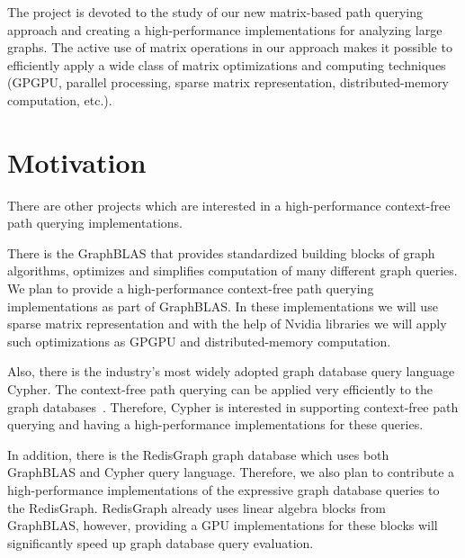 \documentclass[12pt]{article}  %
\theoremstyle{remark}
\begin{document}
The project is devoted to the study of our new matrix-based path querying approach and creating a high-performance implementations for analyzing large graphs. The active use of matrix operations in our approach makes it possible to efficiently apply a wide class of matrix optimizations and computing techniques (GPGPU, parallel processing, sparse matrix representation, distributed-memory computation, etc.).

\section{Motivation}
There are other projects which are interested in a high-performance context-free path querying implementations.

There is the GraphBLAS that provides standardized building blocks of graph algorithms, optimizes and simplifies computation of many different graph queries. We plan to provide a high-performance context-free path querying implementations as part of GraphBLAS. In these implementations we will use sparse matrix representation and with the help of Nvidia libraries we will apply such optimizations as GPGPU and distributed-memory computation.

Also, there is the industry’s most widely adopted graph database query language Cypher. The context-free path querying can be applied very efficiently to the graph databases~\cite{kuijpers2019experimental}. Therefore, Cypher is interested in supporting context-free path querying and having a high-performance implementations for these queries.

In addition, there is the RedisGraph graph database which uses both GraphBLAS and Cypher query language. Therefore, we also plan to contribute a high-performance implementations of the expressive graph database queries to the RedisGraph. RedisGraph already uses linear algebra blocks from GraphBLAS, however, providing a GPU implementations for these blocks will significantly speed up graph database query evaluation.


\end{document}

